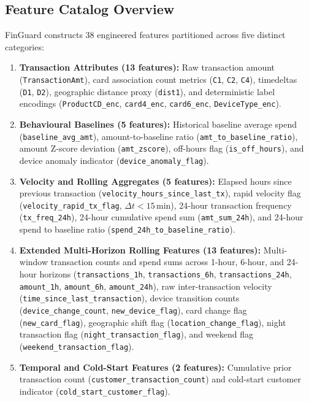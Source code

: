 \documentclass[conference]{IEEEtran}
\begin{document}
\subsection{Feature Catalog Overview}
FinGuard constructs 38 engineered features partitioned across five distinct categories:
\begin{enumerate}
    \item \textbf{Transaction Attributes (13 features):} Raw transaction amount (\texttt{TransactionAmt}), card association count metrics (\texttt{C1}, \texttt{C2}, \texttt{C4}), timedeltas (\texttt{D1}, \texttt{D2}), geographic distance proxy (\texttt{dist1}), and deterministic label encodings (\texttt{ProductCD\_enc}, \texttt{card4\_enc}, \texttt{card6\_enc}, \texttt{DeviceType\_enc}).
    \item \textbf{Behavioural Baselines (5 features):} Historical baseline average spend (\texttt{baseline\_avg\_amt}), amount-to-baseline ratio (\texttt{amt\_to\_baseline\_ratio}), amount Z-score deviation (\texttt{amt\_zscore}), off-hours flag (\texttt{is\_off\_hours}), and device anomaly indicator (\texttt{device\_anomaly\_flag}).
    \item \textbf{Velocity and Rolling Aggregates (5 features):} Elapsed hours since previous transaction (\texttt{velocity\_hours\_since\_last\_tx}), rapid velocity flag (\texttt{velocity\_rapid\_tx\_flag}, $\Delta t < 15$\,min), 24-hour transaction frequency (\texttt{tx\_freq\_24h}), 24-hour cumulative spend sum (\texttt{amt\_sum\_24h}), and 24-hour spend to baseline ratio (\texttt{spend\_24h\_to\_baseline\_ratio}).
    \item \textbf{Extended Multi-Horizon Rolling Features (13 features):} Multi-window transaction counts and spend sums across 1-hour, 6-hour, and 24-hour horizons (\texttt{transactions\_1h}, \texttt{transactions\_6h}, \texttt{transactions\_24h}, \texttt{amount\_1h}, \texttt{amount\_6h}, \texttt{amount\_24h}), raw inter-transaction velocity (\texttt{time\_since\_last\_transaction}), device transition counts (\texttt{device\_change\_count}, \texttt{new\_device\_flag}), card change flag (\texttt{new\_card\_flag}), geographic shift flag (\texttt{location\_change\_flag}), night transaction flag (\texttt{night\_transaction\_flag}), and weekend flag (\texttt{weekend\_transaction\_flag}).
    \item \textbf{Temporal and Cold-Start Features (2 features):} Cumulative prior transaction count (\texttt{customer\_transaction\_count}) and cold-start customer indicator (\texttt{cold\_start\_customer\_flag}).
\end{enumerate}
\end{document}
